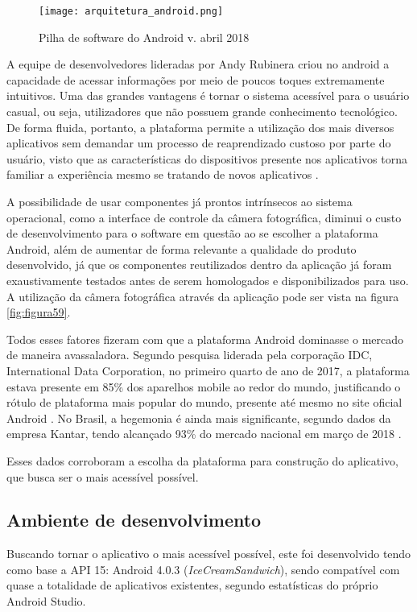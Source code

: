 \begin{figure}[!ht]
	\centering
\texttt{[image: arquitetura\_android.png]}   
	\caption{Pilha de software do Android v. abril 2018}\citep{Android1}
	\label{fig:figura58b}
\end{figure}



A equipe de desenvolvedores lideradas por Andy Rubinera criou no android a capacidade de acessar informações por meio de poucos toques extremamente intuitivos. Uma das grandes vantagens é tornar o sistema acessível para o usuário casual, ou seja, utilizadores que não possuem grande conhecimento tecnológico. De forma fluida, portanto, a plataforma permite a utilização dos mais diversos aplicativos sem demandar um processo de reaprendizado custoso por parte do usuário, visto que as características do dispositivos presente nos aplicativos torna familiar a experiência mesmo se tratando de novos aplicativos \citep{Android3}.

A possibilidade de usar componentes já prontos intrínsecos ao sistema operacional, como a interface de controle da câmera fotográfica, diminui o custo de desenvolvimento para o software em questão ao se escolher a plataforma Android, além de aumentar de forma relevante a qualidade do produto desenvolvido, já que os componentes reutilizados dentro da aplicação já foram exaustivamente testados antes de serem homologados e disponibilizados para uso. A utilização da câmera fotográfica através da aplicação pode ser vista na figura \ref{fig:figura59}.

Todos esses fatores fizeram com que a plataforma Android dominasse o mercado de maneira avassaladora. Segundo pesquisa liderada pela corporação IDC, International Data Corporation, no primeiro quarto de ano de 2017, a plataforma estava presente em 85\% dos aparelhos mobile ao redor do mundo, justificando o rótulo de plataforma mais popular do mundo, presente até mesmo no site oficial Android \citep{Android4} \citep{Android5}. No Brasil, a hegemonia é ainda mais significante, segundo dados da empresa Kantar, tendo alcançado 93\% do mercado nacional em março de 2018 \citep{Android6}.

Esses dados corroboram a escolha da plataforma para construção do aplicativo, que busca ser o mais acessível possível.


\subsection{Ambiente de desenvolvimento}
Buscando tornar o aplicativo o mais acessível possível, este foi desenvolvido tendo como base a API 15: Android 4.0.3 (\textit{IceCreamSandwich}), sendo compatível com quase a totalidade de aplicativos existentes, segundo estatísticas do próprio Android Studio.

